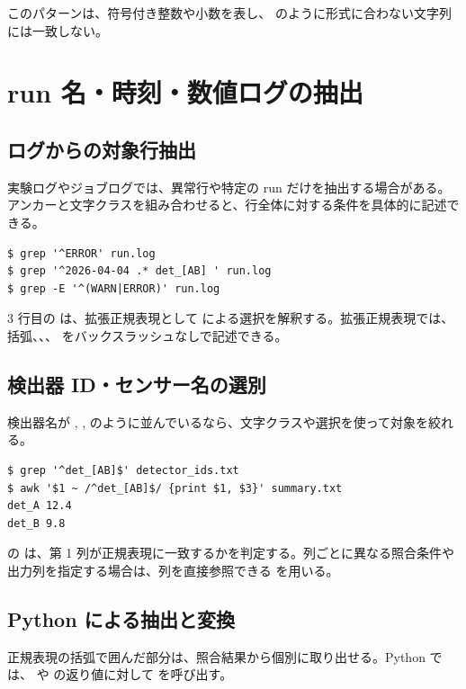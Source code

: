 このパターンは、符号付き整数や小数を表し、 のように形式に合わない文字列には一致しない。

\section{run 名・時刻・数値ログの抽出}

\subsection{ログからの対象行抽出}

実験ログやジョブログでは、異常行や特定の run だけを抽出する場合がある。アンカーと文字クラスを組み合わせると、行全体に対する条件を具体的に記述できる。

\begin{lstlisting}[numbers=none, xleftmargin=2\zw]
$ grep '^ERROR' run.log
$ grep '^2026-04-04 .* det_[AB] ' run.log
$ grep -E '^(WARN|ERROR)' run.log
\end{lstlisting}

3 行目の  は、拡張正規表現として \code{|} による選択を解釈する。拡張正規表現では、括弧、\code{+}、、\code{|} をバックスラッシュなしで記述できる。

\subsection{検出器 ID・センサー名の選別}

検出器名が , ,  のように並んでいるなら、文字クラスや選択を使って対象を絞れる。

\begin{lstlisting}[numbers=none, xleftmargin=2\zw]
$ grep '^det_[AB]$' detector_ids.txt
$ awk '$1 ~ /^det_[AB]$/ {print $1, $3}' summary.txt
det_A 12.4
det_B 9.8
\end{lstlisting}

 の  は、第 1 列が正規表現に一致するかを判定する。列ごとに異なる照合条件や出力列を指定する場合は、列を直接参照できる  を用いる。

\subsection{Python による抽出と変換}

正規表現の括弧で囲んだ部分は、照合結果から個別に取り出せる。Python では、 や  の返り値に対して  を呼び出す。

